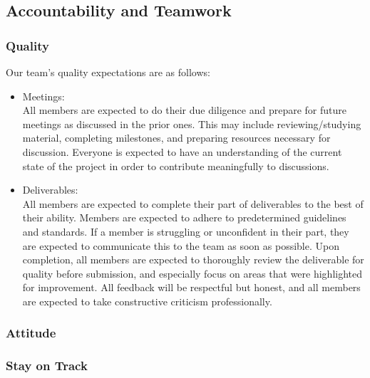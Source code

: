 \documentclass{article}
\begin{document}
\subsection*{Accountability and Teamwork}

\subsubsection*{Quality}

Our team's quality expectations are as follows:
\begin{itemize}
  \item Meetings: \\All members are expected to do their due diligence and prepare for future meetings as discussed in the prior ones. This may include reviewing/studying material, completing milestones, and preparing resources necessary for discussion. Everyone is expected to have an understanding of the current state of the project in order to contribute meaningfully to discussions.
  \item Deliverables: \\All members are expected to complete their part of deliverables to the best of their ability. Members are expected to adhere to predetermined guidelines and standards. If a member is struggling or unconfident in their part, they are expected to communicate this to the team as soon as possible. Upon completion, all members are expected to thoroughly review the deliverable for quality before submission, and especially focus on areas that were highlighted for improvement. All feedback will be respectful but honest, and all members are expected to take constructive criticism professionally.
\end{itemize}

\subsubsection*{Attitude}


\subsubsection*{Stay on Track}
\end{document}
